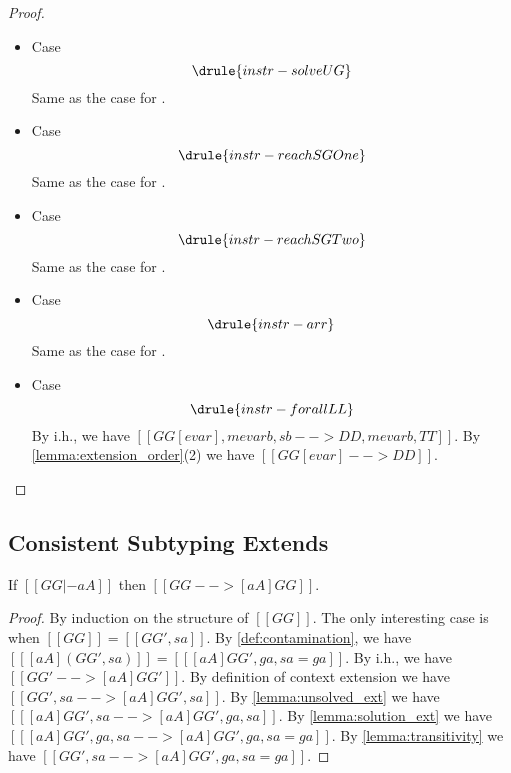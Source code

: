 \begin{proof}
\begin{itemize}
  \item Case \[  \drule{instr-solveUG}\] Same as the case for .

  \item Case \[  \drule{instr-reachSGOne}  \]  Same as the case for .

  \item Case \[  \drule{instr-reachSGTwo}  \]  Same as the case for .

  \item Case \[ \drule{instr-arr} \] Same as the case for .

  \item Case \[ \drule{instr-forallLL}   \]
    By i.h., we have $[[ GG[evar] , mevarb, sb --> DD, mevarb, TT ]]$. By \cref{lemma:extension_order}(2) we have $[[ GG[evar] --> DD  ]]$.

  \end{itemize}
\end{proof}

\subsection{Consistent Subtyping Extends}

\begin{lemma} \label{lemma:contamination_extension}
  If $[[GG |- aA ]]$ then $[[GG --> [aA] GG]]$.
\end{lemma}
\begin{proof}
  By induction on the structure of $[[GG]]$. The only interesting case is when $[[GG]] = [[GG' , sa]] $. By \cref{def:contamination},
  we have $[[ [aA] (GG' , sa) ]] = [[ [aA] GG' , ga, sa = ga]] $. By i.h., we have $[[ GG' --> [aA] GG'  ]]$.
  By definition of context extension we have $[[ GG' , sa --> [aA] GG' , sa  ]]$. By \cref{lemma:unsolved_ext} we have
  $[[ [aA] GG' , sa --> [aA] GG' , ga, sa ]]$. By \cref{lemma:solution_ext} we have $[[ [aA] GG' , ga, sa --> [aA] GG' , ga, sa = ga  ]]$.
  By \cref{lemma:transitivity} we have $[[ GG' , sa --> [aA] GG' , ga, sa = ga ]]$.
\end{proof}

